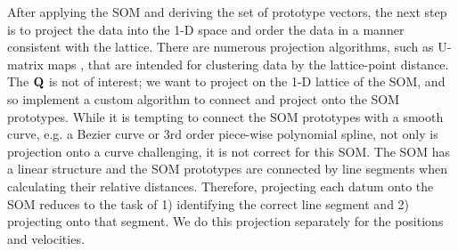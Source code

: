 \documentclass[fleqn,usenatbib]{mnras}
\begin{document}
      After applying the SOM and deriving the set of prototype vectors, the next
      step is to project the data into the 1-D space and order the data in a
      manner consistent with the lattice. There are numerous projection
      algorithms, such as U-matrix maps \citep{Ultsch1990}, that are intended
      for clustering data by the lattice-point distance. The $\mathbf{Q}$ is not of
      interest; we want to project on the 1-D lattice of the SOM, and so
      implement a custom algorithm to connect and project onto the SOM
      prototypes. While it is tempting to connect the SOM prototypes with a
      smooth curve, e.g. a Bezier curve \citep{Bezier1982} or 3rd order
      piece-wise polynomial spline, not only is projection onto a curve
      challenging, it is not correct for this SOM. The SOM has a linear
      structure and the SOM prototypes are connected by line segments when
      calculating their relative distances. Therefore, projecting each datum
      onto the SOM reduces to the task of 1) identifying the correct line
      segment and 2) projecting onto that segment. We do this projection
      separately for the positions and velocities.
\end{document}
